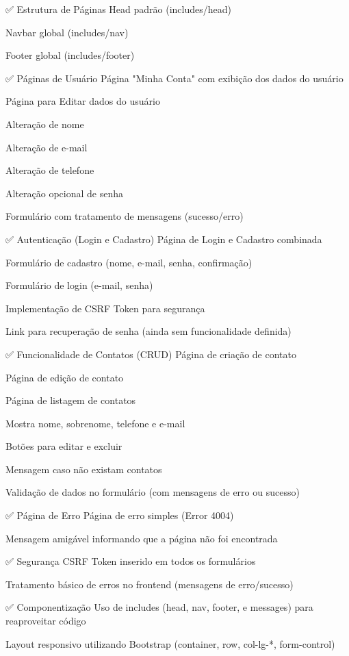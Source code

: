 ✅ Estrutura de Páginas
 Head padrão (includes/head)

 Navbar global (includes/nav)

 Footer global (includes/footer)


✅ Páginas de Usuário
 Página "Minha Conta" com exibição dos dados do usuário

 Página para Editar dados do usuário

Alteração de nome

Alteração de e-mail

Alteração de telefone

Alteração opcional de senha

 Formulário com tratamento de mensagens (sucesso/erro)


✅ Autenticação (Login e Cadastro)
 Página de Login e Cadastro combinada

Formulário de cadastro (nome, e-mail, senha, confirmação)

Formulário de login (e-mail, senha)

Implementação de CSRF Token para segurança

Link para recuperação de senha (ainda sem funcionalidade definida)


✅ Funcionalidade de Contatos (CRUD)
 Página de criação de contato

 Página de edição de contato

 Página de listagem de contatos

Mostra nome, sobrenome, telefone e e-mail

Botões para editar e excluir

Mensagem caso não existam contatos

 Validação de dados no formulário (com mensagens de erro ou sucesso)



✅ Página de Erro
 Página de erro simples (Error 4004)

Mensagem amigável informando que a página não foi encontrada


✅ Segurança
 CSRF Token inserido em todos os formulários

 Tratamento básico de erros no frontend (mensagens de erro/sucesso)
 

✅ Componentização
 Uso de includes (head, nav, footer, e messages) para reaproveitar código

 Layout responsivo utilizando Bootstrap (container, row, col-lg-*, form-control)


